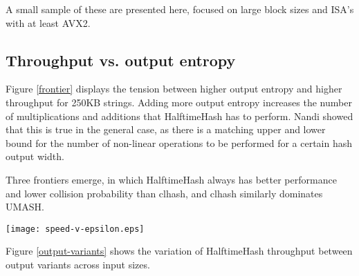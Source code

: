 \documentclass[sigconf, nonacm]{acmart}
\begin{document}
A small sample of these are presented here, focused on large block sizes and ISA's with at least AVX2.

\subsection{Throughput vs. output entropy}

Figure \ref{frontier} displays the tension between higher output entropy and higher throughput for 250KB strings.
Adding more output entropy increases the number of multiplications and additions that HalftimeHash has to perform.
Nandi showed that this is true in the general case, as there is a matching upper and lower bound for the number of non-linear operations to be performed for a certain hash output width.

Three frontiers emerge, in which HalftimeHash always has better performance and lower collision probability than clhash, and clhash similarly dominates UMASH.

\texttt{[image: speed-v-epsilon.eps]}




Figure \ref{output-variants} shows the variation of HalftimeHash throughput between output variants across input sizes.
\end{document}
